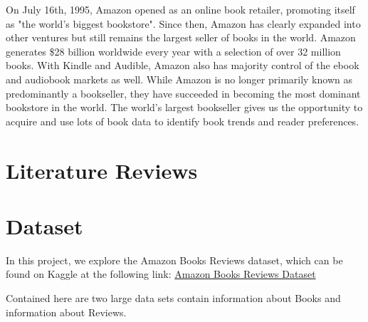 \documentclass[12pt]{article}
\numberwithin{equation}{section}
\begin{document}
On July 16th, 1995, Amazon opened as an online book retailer, promoting itself as "the world's biggest bookstore". Since then, Amazon has clearly expanded into other ventures but still remains the largest seller of books in the world. Amazon generates \$28 billion worldwide every year with a selection of over 32 million books. With Kindle and Audible, Amazon also has majority control of the ebook and audiobook markets as well. While Amazon is no longer primarily known as predominantly a bookseller, they have succeeded in becoming the most dominant bookstore in the world. The world's largest bookseller gives us the opportunity to acquire and use lots of book data to identify book trends and reader preferences.

\section{Literature Reviews}

\section{Dataset}

In this project, we explore the Amazon Books Reviews dataset, which can be found on Kaggle at the following link: \href{https://www.kaggle.com/datasets/mohamedbakhet/amazon-books-reviews}{Amazon Books Reviews Dataset}

Contained here are two large data sets contain information about Books and information about Reviews.
\end{document}
